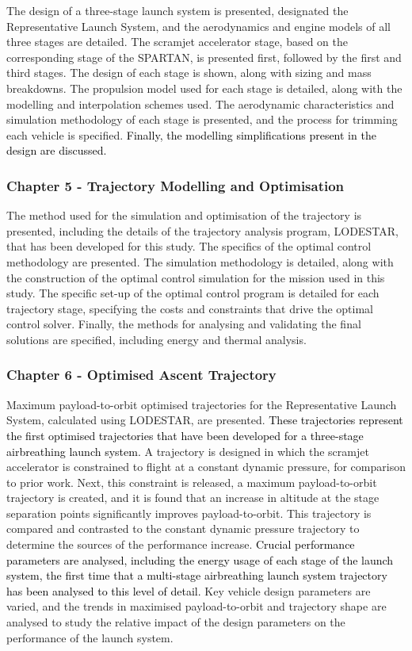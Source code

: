       The design of a three-stage launch system is presented, designated the Representative Launch System, and the aerodynamics and engine models of all three stages are detailed. The scramjet accelerator stage, based on the corresponding stage of the SPARTAN, is presented first, followed by the first and third stages. The design of each stage is shown, along with sizing and mass breakdowns. The propulsion model used for each stage is detailed, along with the modelling and interpolation schemes used. The aerodynamic characteristics and simulation methodology of each stage is presented, and the process for trimming each vehicle is specified. \textcolor{black}{Finally, the modelling simplifications present in the design are discussed.}
      
      
      \subsubsection*{Chapter 5 - Trajectory Modelling and Optimisation}
      
      The method used for the simulation and optimisation of the trajectory is presented, including the details of the trajectory analysis program, LODESTAR, that has been developed for this study. The specifics of the optimal control methodology are presented. The simulation methodology is detailed, along with the construction of the optimal control simulation for the mission used in this study. The specific set-up of the optimal control program is detailed for each trajectory stage, specifying the costs and constraints that drive the optimal control solver. Finally, the methods for analysing and validating the final solutions are specified, including energy and thermal analysis.
      
      \subsubsection*{Chapter 6 - Optimised Ascent Trajectory}
      
Maximum payload-to-orbit optimised trajectories for the Representative Launch System, calculated using LODESTAR, are presented. \textcolor{black}{These trajectories represent the first optimised trajectories that have been developed for a three-stage airbreathing launch system.} A trajectory is designed in which the scramjet accelerator is constrained to flight at a constant dynamic pressure, for comparison to prior work. Next, this constraint is released, a maximum payload-to-orbit trajectory is created, and it is found that an increase in altitude at the stage separation points significantly improves payload-to-orbit.
 This trajectory is compared and contrasted to the constant dynamic pressure trajectory to determine the sources of the performance increase. \textcolor{black}{Crucial performance parameters are analysed, including the energy usage of each stage of the launch system, the first time that a multi-stage airbreathing launch system trajectory has been analysed to this level of detail.} 
 Key vehicle design parameters are varied, and the trends in maximised payload-to-orbit and trajectory shape are analysed to study the relative impact of the design parameters on the performance of the launch system. 
 
